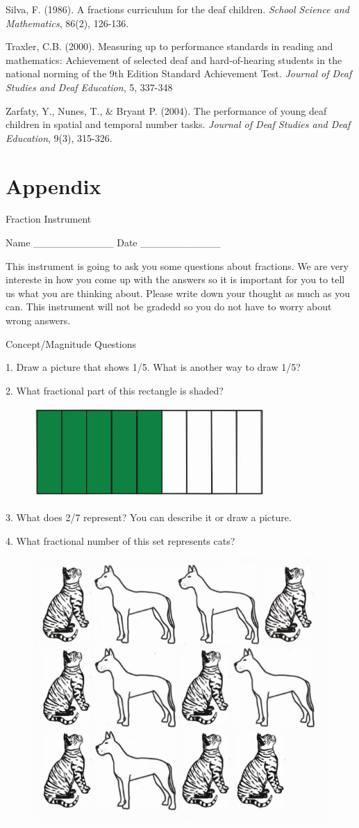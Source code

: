 \documentclass[11.5pt]{sig-alternate} %
\begin{document}
Silva, F. (1986). A fractions curriculum for the deaf children. \textit{School Science and Mathematics}, 86(2), 126-136.

Traxler, C.B. (2000). Measuring up to performance standards in reading and mathematics: Achievement of selected deaf and hard-of-hearing students in the national norming of the 9th Edition Standard Achievement Test. \textit{Journal of Deaf Studies and Deaf Education}, 5, 337-348

Zarfaty, Y., Nunes, T., \& Bryant P. (2004). The performance of young deaf children in spatial and temporal number tasks. \textit{Journal of Deaf Studies and Deaf Education}, 9(3), 315-326.
\clearpage
\onecolumn

\section*{Appendix}

Fraction Instrument

Name \_\_\_\_\_\_\_\_\_\_\_ Date \_\_\_\_\_\_\_\_\_\_\_

This instrument is going to ask you some questions about fractions. We are very intereste in how you come up with the answers so it is important for you to tell us what you are thinking about. Please write down your thought as much as you can. This instrument will not be gradedd so you do not have to worry about wrong answers.

Concept/Magnitude Questions

1. Draw a picture that shows 1/5. What is another way to draw 1/5?

2. What fractional part of this rectangle is shaded?

\begin{figure}[h]
    \centering
    \includegraphics[width=0.5\linewidth]{images/a2.png}
\end{figure}

3. What does 2/7 represent? You can describe it or draw a picture.

4. What fractional number of this set represents cats?

\begin{figure}[h]
    \centering
    \includegraphics[width=0.5\linewidth]{images/a4.png}
\end{figure}
\end{document}
